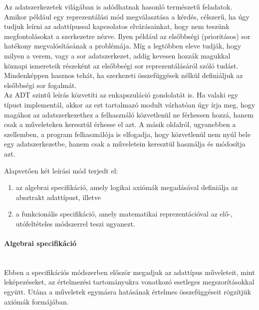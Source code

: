 \documentclass[12pt,margin=0px]{article}
\begin{document}
    {\footnotesize \noindent {\color{blue} \faLightbulbO\ $\triangleright$ } }

    {\footnotesize
    \noindent Az adatszerkezetek világában is adódhatnak hasonló természetű feladatok. Amikor például egy reprezentálási mód megválasztása a kérdés, célszerű, ha úgy tudjuk leírni az adattípussal kapcsolatos elvárásainkat, hogy nem teszünk megfontolásokat a szerkezetre nézve. Ilyen például az elsőbbségi (prioritásos) sor hatékony megvalósításának a problémája. Míg a legtöbben eleve tudják, hogy milyen a verem, vagy a sor adatszerkezet, addig kevesen hozzák magukkal köznapi ismereteik részeként az elsőbbségi sor reprezentálásáról szóló tudást. Mindenképpen hasznos tehát, ha szerkezeti összefüggések nélkül definiáljuk az elsőbbségi sor fogalmát.}\\

    {\footnotesize
    \noindent Az ADT szintű leírás közvetíti az enkapszuláció gondolatát is. Ha valaki egy típust implementál, akkor az ezt tartalmazó modult várhatóan úgy írja meg, hogy magához az adatszerkezethez a felhasználó közvetlenül ne férhessen hozzá, hanem csak a műveleteken keresztül érhesse el azt. A másik oldalról, ugyanebben a szellemben, a program felhasználója is elfogadja, hogy közvetlenül nem nyúl bele egy adatszerkezetbe, hanem csak a műveletein keresztül használja és módosítja azt.}\\

    {\footnotesize
    \noindent Alapvetően két leírási mód terjedt el:
    \begin{enumerate}
        \item az algebrai specifikáció, amely logikai axiómák megadásával definiálja az absztrakt adattípust, illetve
        \item a funkcionális specifikáció, amely matematikai reprezentációval az elő-, utófeltételes módszerrel teszi ugyanezt.
    \end{enumerate}
    }
    \noindent {\footnotesize $\triangleleft$ \faLightbulbO }

    \paragraph{Algebrai specifikáció\\\\}

    \noindent Ebben a specifikációs módszerben először megadjuk az adattípus műveleteit, mint leképezéseket, az értelmezési tartományukra vonatkozó esetleges megszorításokkal együtt. Utána a műveletek egymásra hatásának értelmes összefüggéseit rögzítjük axiómák formájában.\\
\end{document}
